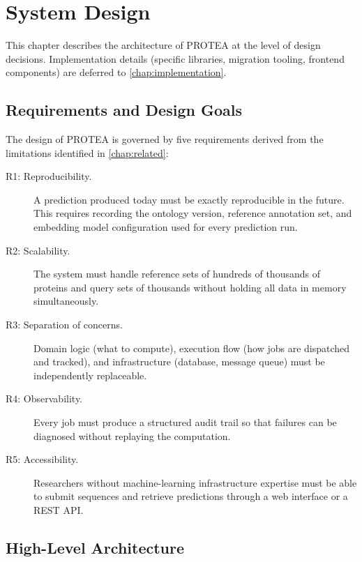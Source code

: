 \chapter{System Design}
\label{chap:design}

This chapter describes the architecture of PROTEA at the level of design
decisions. Implementation details (specific libraries, migration tooling,
frontend components) are deferred to \cref{chap:implementation}.

\section{Requirements and Design Goals}
\label{sec:design-goals}

The design of PROTEA is governed by five requirements derived from the
limitations identified in \cref{chap:related}:

\begin{description}
  \item[R1: Reproducibility.] A prediction produced today must be exactly
    reproducible in the future. This requires recording the ontology version,
    reference annotation set, and embedding model configuration used for every
    prediction run.
  \item[R2: Scalability.] The system must handle reference sets of hundreds of
    thousands of proteins and query sets of thousands without holding all data
    in memory simultaneously.
  \item[R3: Separation of concerns.] Domain logic (what to compute), execution
    flow (how jobs are dispatched and tracked), and infrastructure (database,
    message queue) must be independently replaceable.
  \item[R4: Observability.] Every job must produce a structured audit trail so
    that failures can be diagnosed without replaying the computation.
  \item[R5: Accessibility.] Researchers without machine-learning infrastructure
    expertise must be able to submit sequences and retrieve predictions through a
    web interface or a REST API.
\end{description}

\section{High-Level Architecture}
\label{sec:architecture}

